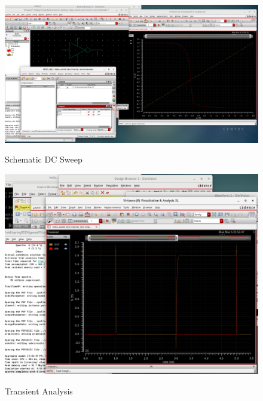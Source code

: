 \documentclass{article}
\begin{document}
\begin{figure}[h]
	\includegraphics[width =\textwidth]{schemdcsweep.png}
	\label{schematicdcsweep}
	\caption{Schematic DC Sweep}
\end{figure}

\begin{figure}[h]
	\includegraphics[width =\textwidth]{tran.png}
	\label{schematictrans}
	\caption{Transient Analysis}
\end{figure}
\end{document}
